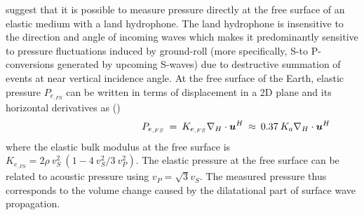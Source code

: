 \documentclass[]{article}
\begin{document}
	\textcite{edme2018seismic} suggest that it is possible to measure pressure directly at the free surface of an elastic medium with a land hydrophone. The land hydrophone is insensitive to the direction and angle of incoming waves which makes it predominantly sensitive to pressure fluctuations induced by ground-roll (more specifically, S-to P-conversions generated by upcoming S-waves) due to destructive summation of events at near vertical incidence angle. At the free surface of the Earth, elastic pressure $P_{e_{, FS}}$ can be written in terms of displacement in a 2D plane and its horizontal derivatives as (\cite{edme2018seismic})
	\begin{align}\label{eq:PRESS_edme}
		\shoveright \shoveright \shoveright \shoveright \shoveright \shoveright  \shoveright \shoveright  \shoveright  \shoveright  \shoveright \shoveright  
		P_{e_{, FS}} \: &=\: K_{e_{, FS}} \nabla_{H} \cdot \bm{u}^{H}  \: \approx \: 0.37 \: K_{a} \nabla_{H} \cdot \bm{u}^{H} 
	\end{align}
	where the elastic bulk modulus at the free surface is  $K_{e_{, FS}} = 2 \rho \: v_{S}^{2} \: (1- 4 \: v_{S}^{2}/3 \: v_{P}^{2}) $. The elastic pressure at the free surface can be related to acoustic pressure using $v_{P} = \sqrt{3} v_{S}$. The measured pressure thus corresponds to the volume change caused by the dilatational part of surface wave propagation.\\ %
	
\end{document}
